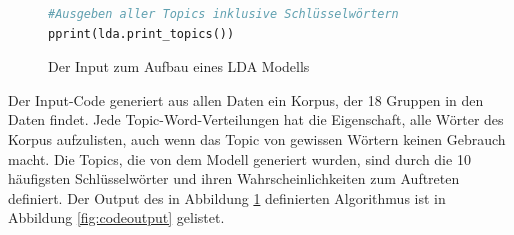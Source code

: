 \documentclass[german,version-2020-11]{uzl-thesis}
\begin{document}
\begin{itemize}
\begin{enumerate}
\begin{figure}[H]
\begin{lstlisting}[language=Python, basicstyle=\small]
#Ausgeben aller Topics inklusive Schlüsselwörtern
pprint(lda.print_topics())

\end{lstlisting}
\caption{Der Input zum Aufbau eines LDA Modells}
\label{fig:codeinput}
\end{figure}

Der Input-Code generiert aus allen Daten ein Korpus, der 18 Gruppen in den Daten findet. Jede Topic-Word-Verteilungen hat die Eigenschaft, alle Wörter des Korpus aufzulisten, auch wenn das Topic von gewissen Wörtern keinen Gebrauch macht. Die Topics, die von dem Modell generiert wurden, sind durch die 10 häufigsten Schlüsselwörter und ihren Wahrscheinlichkeiten zum Auftreten definiert. Der Output des in Abbildung \ref{fig:codeinput} definierten Algorithmus ist in Abbildung \ref{fig:codeoutput} gelistet. 


\end{enumerate}
\end{itemize}
\end{document}
